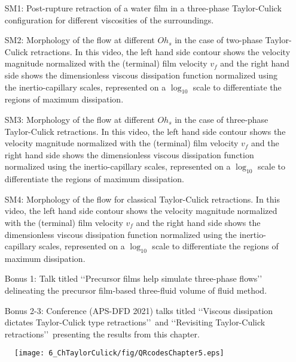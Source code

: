 \begin{subappendices}
	\begin{enumerate}
		\item[SM1:] Post-rupture retraction of a water film in a three-phase Taylor-Culick configuration for different viscosities of the surroundings.
		\item[SM2:] Morphology of the flow at different $Oh_{s}$ in the case of two-phase Taylor-Culick retractions. In this video, the left hand side contour shows the velocity magnitude normalized with the (terminal) film velocity $v_f$ and the right hand side shows the dimensionless viscous dissipation function normalized using the inertio-capillary scales, represented on a $\log_{\text{10}}$ scale to differentiate the regions of maximum dissipation. 
		\item[SM3:] Morphology of the flow at different $Oh_{s}$ in the case of three-phase Taylor-Culick retractions. In this video, the left hand side contour shows the velocity magnitude normalized with the (terminal) film velocity $v_f$ and the right hand side shows the dimensionless viscous dissipation function normalized using the inertio-capillary scales, represented on a $\log_{\text{10}}$ scale to differentiate the regions of maximum dissipation. 
		\item[SM4:] Morphology of the flow for classical Taylor-Culick retractions. In this video, the left hand side contour shows the velocity magnitude normalized with the (terminal) film velocity $v_f$ and the right hand side shows the dimensionless viscous dissipation function normalized using the inertio-capillary scales, represented on a $\log_{\text{10}}$ scale to differentiate the regions of maximum dissipation. 
		\item[Bonus 1:] Talk titled \lq\lq Precursor films help simulate three-phase flows\rq\rq\, delineating the precursor film-based three-fluid volume of fluid method.
		\item[Bonus 2-3:] Conference (APS-DFD 2021) talks titled \lq\lq Viscous dissipation dictates Taylor-Culick type retractions\rq\rq\, and \lq\lq Revisiting Taylor-Culick retractions\rq\rq\, presenting the results from this chapter. 
	\end{enumerate}

\begin{figure*}
	\centering
	\texttt{[image: 6\_ChTaylorCulick/fig/QRcodesChapter5.eps]}
\end{figure*}

\end{subappendices}

